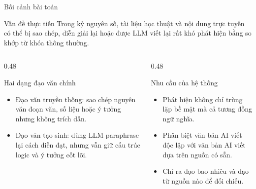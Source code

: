 \documentclass[aspectratio=169,11pt]{beamer}
\def\textbf#1{#1}%
\begin{document}
\begin{frame}{Bối cảnh bài toán}
\begin{block}{Vấn đề thực tiễn}
Trong kỷ nguyên số, tài liệu học thuật và nội dung trực tuyến có thể bị sao chép, diễn giải lại hoặc được LLM viết lại rất khó phát hiện bằng so khớp từ khóa thông thường.
\end{block}

\vspace{0.25cm}
\begin{columns}[T]
\begin{column}{0.48\textwidth}
\begin{block}{Hai dạng đạo văn chính}
\begin{itemize}
  \item[\ding{55}] \textbf{Đạo văn truyền thống:} sao chép nguyên văn đoạn văn, số liệu hoặc ý tưởng nhưng không trích dẫn.
  \item[\ding{55}] \textbf{Đạo văn tạo sinh:} dùng LLM paraphrase lại cách diễn đạt, nhưng vẫn giữ cấu trúc logic và ý tưởng cốt lõi.
\end{itemize}
\end{block}
\end{column}

\begin{column}{0.48\textwidth}
\begin{block}{Nhu cầu của hệ thống}
\begin{itemize}
  \item[\ding{51}] Phát hiện không chỉ trùng lặp bề mặt mà cả \textbf{tương đồng ngữ nghĩa}.
  \item[\ding{51}] Phân biệt văn bản AI viết độc lập với văn bản AI viết dựa trên nguồn có sẵn.
  \item[\ding{51}] Chỉ ra \textbf{đạo bao nhiêu} và \textbf{đạo từ nguồn nào} để đối chiếu.
\end{itemize}
\end{block}
\end{column}
\end{columns}
\end{frame}
\end{document}
